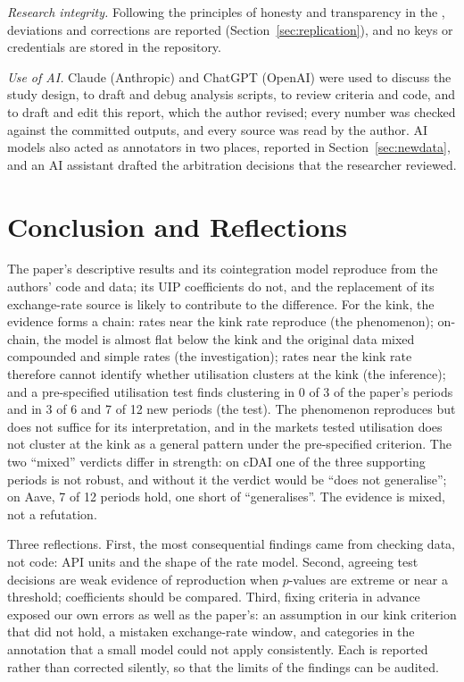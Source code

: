\documentclass[11pt]{article}
\begin{document}
\emph{Research integrity.} Following the principles of honesty and transparency in the \citet{nhmrc2018code}, deviations and corrections are reported (Section~\ref{sec:replication}), and no keys or credentials are stored in the repository.

\emph{Use of AI.} Claude (Anthropic) and ChatGPT (OpenAI) were used to discuss the study design, to draft and debug analysis scripts, to review criteria and code, and to draft and edit this report, which the author revised; every number was checked against the committed outputs, and every source was read by the author. AI models also acted as annotators in two places, reported in Section~\ref{sec:newdata}, and an AI assistant drafted the arbitration decisions that the researcher reviewed.

\section{Conclusion and Reflections}

The paper's descriptive results and its cointegration model reproduce from the authors' code and data; its UIP coefficients do not, and the replacement of its exchange-rate source is likely to contribute to the difference. For the kink, the evidence forms a chain: rates near the kink rate reproduce (the phenomenon); on-chain, the model is almost flat below the kink and the original data mixed compounded and simple rates (the investigation); rates near the kink rate therefore cannot identify whether utilisation clusters at the kink (the inference); and a pre-specified utilisation test finds clustering in 0 of 3 of the paper's periods and in 3 of 6 and 7 of 12 new periods (the test). The phenomenon reproduces but does not suffice for its interpretation, and in the markets tested utilisation does not cluster at the kink as a general pattern under the pre-specified criterion. The two ``mixed'' verdicts differ in strength: on cDAI one of the three supporting periods is not robust, and without it the verdict would be ``does not generalise''; on Aave, 7 of 12 periods hold, one short of ``generalises''. The evidence is mixed, not a refutation.

Three reflections. First, the most consequential findings came from checking data, not code: API units and the shape of the rate model. Second, agreeing test decisions are weak evidence of reproduction when $p$-values are extreme or near a threshold; coefficients should be compared. Third, fixing criteria in advance exposed our own errors as well as the paper's: an assumption in our kink criterion that did not hold, a mistaken exchange-rate window, and categories in the annotation that a small model could not apply consistently. Each is reported rather than corrected silently, so that the limits of the findings can be audited.
\end{document}
